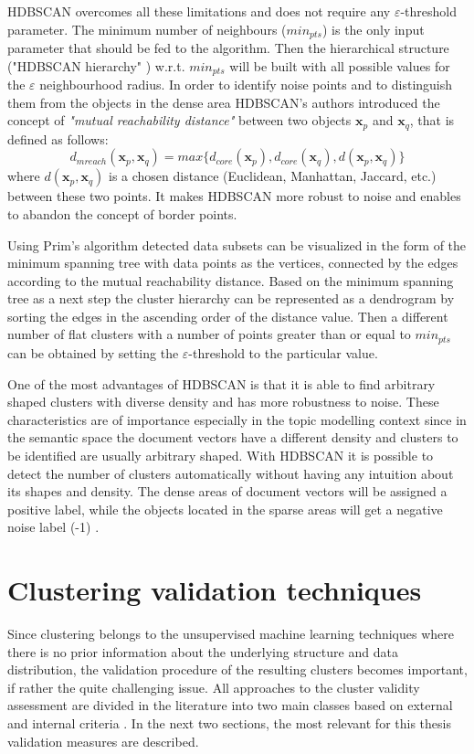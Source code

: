 \documentclass[fontsize=12pt,a4paper,twoside,openany]{scrbook}
\begin{document}
HDBSCAN overcomes all these limitations and does not require any \(\varepsilon\)-threshold parameter. The minimum number of neighbours (\(min_{pts}\)) is the only input parameter that should be fed to the algorithm. Then the hierarchical structure ("HDBSCAN hierarchy" \parencite{Campello13}) w.r.t. \(min_{pts}\) will be built with all possible values for the \(\varepsilon\) neighbourhood radius. In order to identify noise points and to distinguish them from the objects in the dense area HDBSCAN's authors introduced the concept of \emph{"mutual reachability distance"} \parencite[p.~163]{Campello13} between two objects \(\textbf{x}_p\) and \(\textbf{x}_q\), that is defined as follows: \[d_{mreach}(\textbf{x}_p, \textbf{x}_q) = max\{d_{core}(\textbf{x}_p), d_{core}(\textbf{x}_q), d(\textbf{x}_p, \textbf{x}_q)\}\] 
where \(d(\textbf{x}_p, \textbf{x}_q)\) is a chosen distance (Euclidean, Manhattan, Jaccard, etc.) between these two points. It makes HDBSCAN more robust to noise and enables to abandon the concept of border points. 

Using Prim's algorithm \parencite{Mamun16} detected data subsets can be visualized in the form of the minimum spanning tree with data points as the vertices, connected by the edges according to the mutual reachability distance. Based on the minimum spanning tree as a next step the cluster hierarchy can be represented as a dendrogram by sorting the edges in the ascending order of the distance value. Then a different number of flat clusters with a number of points greater than or equal to \(min_{pts}\) can be obtained by setting the \(\varepsilon\)-threshold to the particular value.

One of the most advantages of HDBSCAN is that it is able to find arbitrary shaped clusters with diverse density and has more robustness to noise. These characteristics are of importance especially in the topic modelling context since in the semantic space the document vectors have a different density \parencite{Angelov20} and clusters to be identified are usually arbitrary shaped. With HDBSCAN it is possible to detect the number of clusters automatically without having any intuition about its shapes and density. The dense areas of document vectors will be assigned a positive label, while the objects located in the sparse areas will get a negative noise label (-1) \parencite{Angelov20}.

\section{Clustering validation techniques}
\label{sec:validation}
Since clustering belongs to the unsupervised machine learning techniques where there is no prior information about the underlying structure and data distribution, the validation procedure of the resulting clusters becomes important, if rather the quite challenging issue. All approaches to the cluster validity assessment are divided in the literature into two main classes based on external and internal criteria \parencite{Halkidi01a}. In the next two sections, the most relevant for this thesis validation measures are described.
\end{document}
